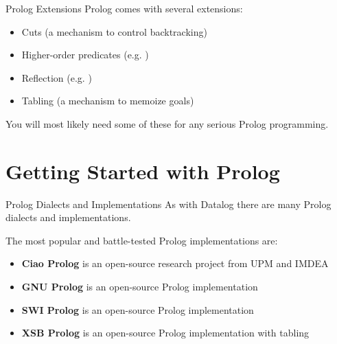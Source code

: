 \begin{frame}{Prolog Extensions}
Prolog comes with several extensions:

\begin{itemize}
    \item Cuts (a mechanism to control backtracking)
    \item Higher-order predicates (e.g. )
    \item Reflection (e.g. )
    \item Tabling (a mechanism to memoize goals)
\end{itemize}

You will most likely need some of these for any serious Prolog programming. 
\end{frame}


\section{Getting Started with Prolog}

\begin{frame}{Prolog Dialects and Implementations}
As with Datalog there are many Prolog dialects and implementations.

The most popular and battle-tested Prolog implementations are:

\begin{itemize}
    \item \textbf{Ciao Prolog} is an open-source research project from UPM and IMDEA 
    \item \textbf{GNU Prolog} is an open-source Prolog implementation
    \item \textbf{SWI Prolog} is an open-source Prolog implementation 
    \item \textbf{XSB Prolog} is an open-source Prolog implementation with tabling
\end{itemize}
\end{frame}

